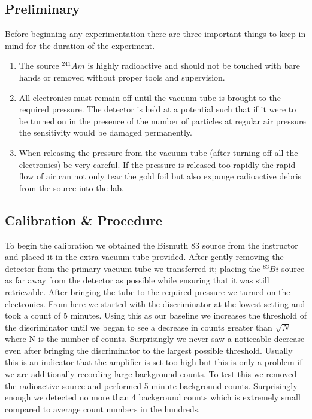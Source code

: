 \subsection{Preliminary}
\indent \indent  Before beginning any experimentation there are three important things to keep in mind for the duration of the experiment. 
\begin{enumerate}
\item The source $^{241} Am$ is highly radioactive and should not be touched with bare hands or removed without proper tools and supervision. 
\item All electronics must remain off until the vacuum tube is brought to the required pressure.  The detector is held at a potential such that if it were to be turned on in the presence of the number of particles at regular air pressure the sensitivity would be damaged permanently.
\item When releasing the pressure from the vacuum tube (after turning off all the electronics) be very careful.  If the pressure is released too rapidly the rapid flow of air can not only tear the gold foil but also expunge radioactive debris from the source into the lab. 
\end{enumerate}

\subsection{Calibration \& Procedure}
\indent \indent  To begin the calibration we obtained the Bismuth 83 source from the instructor and placed it in the extra vacuum tube provided. After gently removing the detector from the primary vacuum tube we transferred it;  placing the $^{83}Bi$ source as far away from the detector as possible while ensuring that it was still retrievable. After bringing the tube to the required pressure we turned on the electronics.  From here we started with the discriminator at the lowest setting and took a count of 5 minutes.  Using this as our baseline we increases the threshold of the discriminator until we began to see a decrease in counts greater than $\sqrt{N}$ where N is the number of counts.  Surprisingly we never saw a noticeable decrease even after bringing the discriminator to the largest possible threshold.  Usually this is an indicator that the amplifier is set too high but this is only a problem if we are additionally recording large background counts.  To test this we removed the radioactive source and performed 5 minute background counts.  Surprisingly enough we detected no more than 4 background counts which is extremely small compared to average count numbers in the hundreds.  

